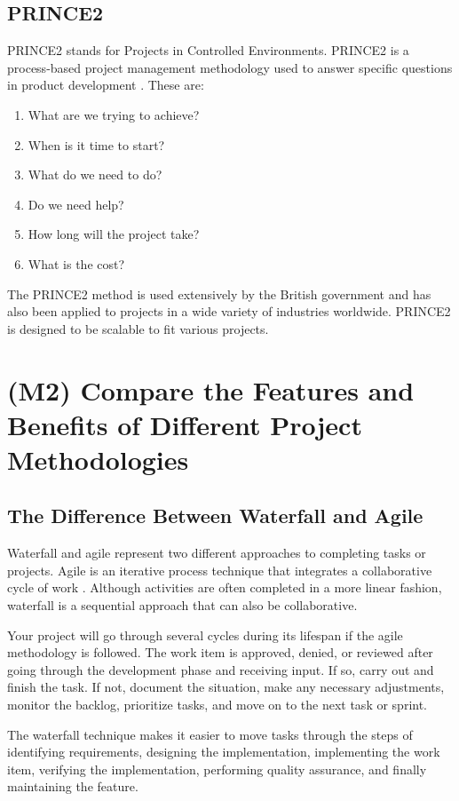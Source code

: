 \documentclass{article}
\begin{document}
\subsection{PRINCE2}
PRINCE2 stands for Projects in Controlled Environments. PRINCE2 is a process-based project management methodology used to answer specific questions in product development \cite{purple}. These are:
\begin{enumerate}
    \item What are we trying to achieve?
    \item When is it time to start?
    \item What do we need to do?
    \item Do we need help?
    \item How long will the project take?
    \item What is the cost?
\end{enumerate}

The PRINCE2 method is used extensively by the British government and has also been applied to projects in a wide variety of industries worldwide. PRINCE2 is designed to be scalable to fit various projects.

\section{(M2) Compare the Features and Benefits of Different Project Methodologies}

\subsection{The Difference Between Waterfall and Agile}
Waterfall and agile represent two different approaches to completing tasks or projects. Agile is an iterative process technique that integrates a collaborative cycle of work \cite{diffs}. Although activities are often completed in a more linear fashion, waterfall is a sequential approach that can also be collaborative.

Your project will go through several cycles during its lifespan if the agile methodology is followed. The work item is approved, denied, or reviewed after going through the development phase and receiving input. If so, carry out and finish the task. If not, document the situation, make any necessary adjustments, monitor the backlog, prioritize tasks, and move on to the next task or sprint.

The waterfall technique makes it easier to move tasks through the steps of identifying requirements, designing the implementation, implementing the work item, verifying the implementation, performing quality assurance, and finally maintaining the feature.
\end{document}
